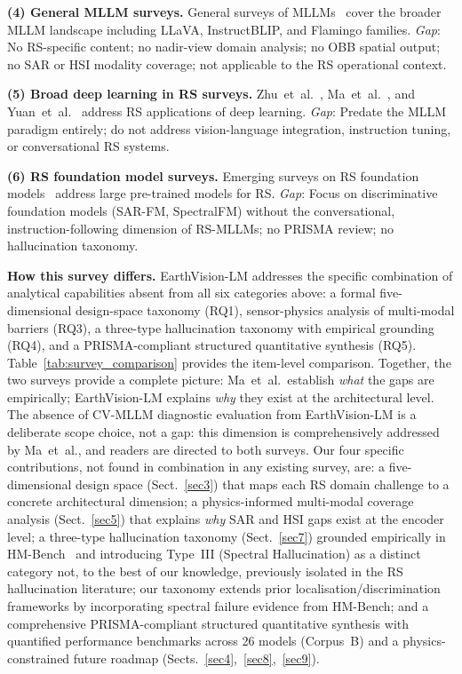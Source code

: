 \textbf{(4) General MLLM surveys.}
General surveys of MLLMs~\cite{yin2024survey,zhang2024vision} cover the
broader MLLM landscape including LLaVA, InstructBLIP, and Flamingo families.
\emph{Gap}: No RS-specific content; no nadir-view domain analysis; no OBB
spatial output; no SAR or HSI modality coverage; not applicable to the
RS operational context.

\textbf{(5) Broad deep learning in RS surveys.}
Zhu~et~al.~\cite{zhu2019sn}, Ma~et~al.~\cite{ma2019deep}, and
Yuan~et~al.~\cite{yuan2021review} address RS applications of deep learning.
\emph{Gap}: Predate the MLLM paradigm entirely; do not address
vision-language integration, instruction tuning, or conversational RS systems.

\textbf{(6) RS foundation model surveys.}
Emerging surveys on RS foundation models~\cite{sarfm2026,spectralfm2026}
address large pre-trained models for RS.
\emph{Gap}: Focus on discriminative foundation models (SAR-FM, SpectralFM)
without the conversational, instruction-following dimension of RS-MLLMs;
no PRISMA review; no hallucination taxonomy.

\textbf{How this survey differs.} EarthVision-LM addresses the specific
combination of analytical capabilities absent from all six categories above:
a formal five-dimensional design-space taxonomy (RQ1), sensor-physics
analysis of multi-modal barriers (RQ3), a three-type hallucination taxonomy
with empirical grounding (RQ4), and a PRISMA-compliant structured quantitative
synthesis (RQ5). Table~\ref{tab:survey_comparison} provides the item-level
comparison.
Together, the two surveys provide a complete picture: Ma~et~al.\ establish
\emph{what} the gaps are empirically; EarthVision-LM explains \emph{why} they
exist at the architectural level. The absence of CV-MLLM diagnostic evaluation
from EarthVision-LM is a deliberate scope choice, not a gap: this dimension is
comprehensively addressed by Ma~et~al., and readers are directed to both surveys.
Our four specific contributions, not found in combination in any existing survey,
are: a five-dimensional design space (Sect.~\ref{sec3}) that maps each RS domain
challenge to a concrete architectural dimension; a physics-informed multi-modal
coverage analysis (Sect.~\ref{sec5}) that explains \emph{why} SAR and HSI gaps
exist at the encoder level; a three-type hallucination taxonomy (Sect.~\ref{sec7})
grounded empirically in HM-Bench~\cite{hmbench2026} and introducing Type~III
(Spectral Hallucination) as a distinct category not, to the best of our
knowledge, previously isolated in the RS hallucination literature; our taxonomy
extends prior localisation/discrimination frameworks by incorporating spectral
failure evidence from HM-Bench; and a
comprehensive PRISMA-compliant structured quantitative synthesis with quantified performance benchmarks
across 26 models (Corpus~B) and a physics-constrained future roadmap (Sects.~\ref{sec4},~\ref{sec8},~\ref{sec9}).

